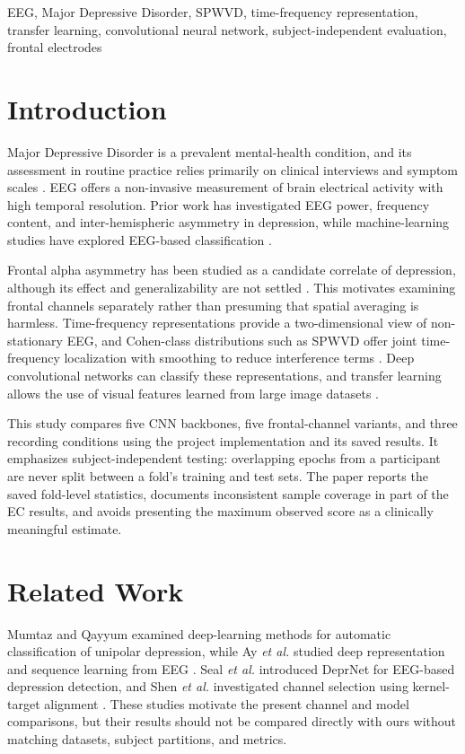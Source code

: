 \documentclass[conference]{IEEEtran}
\begin{document}
\begin{IEEEkeywords}
EEG, Major Depressive Disorder, SPWVD, time-frequency representation,
transfer learning, convolutional neural network, subject-independent
evaluation, frontal electrodes
\end{IEEEkeywords}

\section{Introduction}
Major Depressive Disorder is a prevalent mental-health condition, and
its assessment in routine practice relies primarily on clinical
interviews and symptom scales \cite{who2023}. EEG offers a non-invasive
measurement of brain electrical activity with high temporal resolution.
Prior work has investigated EEG power, frequency content, and
inter-hemispheric asymmetry in depression, while machine-learning
studies have explored EEG-based classification \cite{knott2001,
mumtaz2019,ay2019,seal2021}.

Frontal alpha asymmetry has been studied as a candidate correlate of
depression, although its effect and generalizability are not settled
\cite{thibodeau2006}. This motivates examining frontal channels
separately rather than presuming that spatial averaging is harmless.
Time-frequency representations provide a two-dimensional view of
non-stationary EEG, and Cohen-class distributions such as SPWVD offer
joint time-frequency localization with smoothing to reduce interference
terms \cite{cohen1989,boashash2003}. Deep convolutional networks can
classify these representations, and transfer learning allows the use of
visual features learned from large image datasets \cite{pan2010,deng2009}.

This study compares five CNN backbones, five frontal-channel variants,
and three recording conditions using the project implementation and its
saved results. It emphasizes subject-independent testing: overlapping
epochs from a participant are never split between a fold's training and
test sets. The paper reports the saved fold-level statistics, documents
inconsistent sample coverage in part of the EC results, and avoids
presenting the maximum observed score as a clinically meaningful
estimate.

\section{Related Work}
Mumtaz and Qayyum examined deep-learning methods for automatic
classification of unipolar depression, while Ay \emph{et al.} studied
deep representation and sequence learning from EEG \cite{mumtaz2019,
ay2019}. Seal \emph{et al.} introduced DeprNet for EEG-based depression
detection, and Shen \emph{et al.} investigated channel selection using
kernel-target alignment \cite{seal2021,shen2021}. These studies motivate
the present channel and model comparisons, but their results should not
be compared directly with ours without matching datasets, subject
partitions, and metrics.
\end{document}
